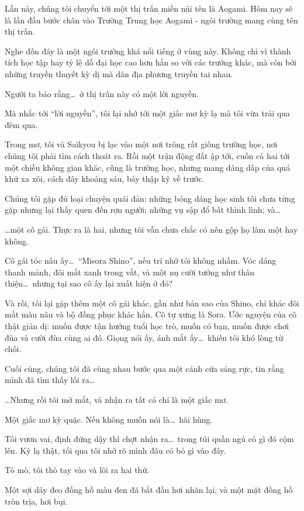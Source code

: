 \documentclass[../main.tex]{subfiles}
\begin{document}
Lần này, chúng tôi chuyển tới một thị trấn miền núi tên là Aogami. Hôm nay sẽ là lần đầu bước chân vào Trường Trung học Aogami - ngôi trường mang cùng tên thị trấn.

Nghe đồn đây là một ngôi trường khá nổi tiếng ở vùng này. Không chỉ vì thành tích học tập hay tỷ lệ dỗ đại học cao hơn hẳn so với các trường khác, mà còn bởi những truyền thuyết kỳ dị mà dân địa phương truyền tai nhau.

Người ta bảo rằng\dots\ ở thị trấn này  có một lời nguyền.

Mà nhắc tới ``lời nguyền'', tôi lại nhớ tới một giấc mơ kỳ lạ mà tôi vừa trải qua đêm qua.

Trong mơ, tôi và Saikyou bị lạc vào một nơi trông rất giống trường học, nơi chúng tôi phải tìm cách thoát ra. Rồi một trận động đất ập tới, cuốn cả hai tới một chiều không gian khác, cũng là trường học, nhưng mang dáng dấp của quá khứ xa xôi, cách đây khoảng sáu, bảy thập kỷ về trước.

Chúng tôi gặp đủ loại chuyện quái đản: những bóng dáng học sinh tôi chưa từng gặp nhưng lại thấy quen đến rợn người; những vụ sập đổ bất thình lình; và\dots

\dots một cô gái. Thực ra là hai, nhưng tôi vẫn chưa chắc có nên gộp họ làm một hay không.

Cô gái tóc nâu ấy\dots\ ``Misora Shino'', nếu trí nhớ tôi không nhầm. Vóc dáng thanh mảnh, đôi mắt xanh trong vắt, và một nụ cười tưởng như thân thiện\dots\ nhưng tại sao cô ấy lại xuất hiện ở đó?

Và rồi, tôi lại gặp thêm một cô gái khác, gần như bản sao của Shino, chỉ khác đôi mắt màu nâu và bộ đồng phục khác hẳn. Cô tự xưng là Sora. Ước nguyện của cô thật giản dị: muốn được tận hưởng tuổi học trò, muốn có bạn, muốn được chơi đùa và cười đùa cùng ai đó. Giọng nói ấy, ánh mắt ấy\dots\ khiến tôi khó lòng từ chối.

Cuối cùng, chúng tôi đã cùng nhau bước qua một cánh cửa sáng rực, tin rằng mình đã tìm thấy lối ra\dots

\dots Nhưng rồi tôi mở mắt, và nhận ra tất cả chỉ là một giấc mơ.

Một giấc mơ kỳ quặc. Nếu không muốn nói là\dots\ hãi hùng.

Tôi vươn vai, định đứng dậy thì chợt nhận ra\dots\ trong túi quần ngủ có gì đó cộm lên. Kỳ lạ thật, tối qua tôi nhớ rõ mình đâu có bỏ gì vào đây.

Tò mò, tôi thò tay vào và lôi ra hai thứ.

Một sợi dây đeo đồng hồ màu đen đã bắt đầu hơi nhăn lại, và một mặt đồng hồ tròn trịa, hơi bụi.
\end{document}
